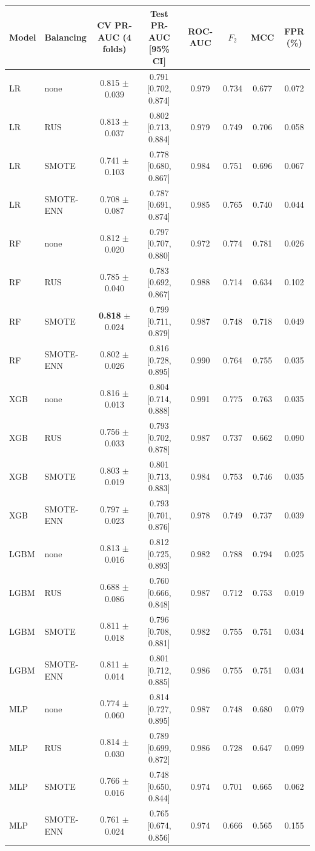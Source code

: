 \begin{tabular}{llcccccc}
\hline
Model & Balancing & CV PR-AUC (4 folds) & Test PR-AUC [95\% CI] & ROC-AUC & $F_2$ & MCC & FPR (\%) \\
\hline
LR & none & {0.815} $\pm$ 0.039 & 0.791 [0.702, 0.874] & 0.979 & 0.734 & 0.677 & 0.072 \\
LR & RUS & {0.813} $\pm$ 0.037 & 0.802 [0.713, 0.884] & 0.979 & 0.749 & 0.706 & 0.058 \\
LR & SMOTE & {0.741} $\pm$ 0.103 & 0.778 [0.680, 0.867] & 0.984 & 0.751 & 0.696 & 0.067 \\
LR & SMOTE-ENN & {0.708} $\pm$ 0.087 & 0.787 [0.691, 0.874] & 0.985 & 0.765 & 0.740 & 0.044 \\
RF & none & {0.812} $\pm$ 0.020 & 0.797 [0.707, 0.880] & 0.972 & 0.774 & 0.781 & 0.026 \\
RF & RUS & {0.785} $\pm$ 0.040 & 0.783 [0.692, 0.867] & 0.988 & 0.714 & 0.634 & 0.102 \\
RF & SMOTE & \textbf{0.818} $\pm$ 0.024 & 0.799 [0.711, 0.879] & 0.987 & 0.748 & 0.718 & 0.049 \\
RF & SMOTE-ENN & {0.802} $\pm$ 0.026 & 0.816 [0.728, 0.895] & 0.990 & 0.764 & 0.755 & 0.035 \\
XGB & none & {0.816} $\pm$ 0.013 & 0.804 [0.714, 0.888] & 0.991 & 0.775 & 0.763 & 0.035 \\
XGB & RUS & {0.756} $\pm$ 0.033 & 0.793 [0.702, 0.878] & 0.987 & 0.737 & 0.662 & 0.090 \\
XGB & SMOTE & {0.803} $\pm$ 0.019 & 0.801 [0.713, 0.883] & 0.984 & 0.753 & 0.746 & 0.035 \\
XGB & SMOTE-ENN & {0.797} $\pm$ 0.023 & 0.793 [0.701, 0.876] & 0.978 & 0.749 & 0.737 & 0.039 \\
LGBM & none & {0.813} $\pm$ 0.016 & 0.812 [0.725, 0.893] & 0.982 & 0.788 & 0.794 & 0.025 \\
LGBM & RUS & {0.688} $\pm$ 0.086 & 0.760 [0.666, 0.848] & 0.987 & 0.712 & 0.753 & 0.019 \\
LGBM & SMOTE & {0.811} $\pm$ 0.018 & 0.796 [0.708, 0.881] & 0.982 & 0.755 & 0.751 & 0.034 \\
LGBM & SMOTE-ENN & {0.811} $\pm$ 0.014 & 0.801 [0.712, 0.885] & 0.986 & 0.755 & 0.751 & 0.034 \\
MLP & none & {0.774} $\pm$ 0.060 & 0.814 [0.727, 0.895] & 0.987 & 0.748 & 0.680 & 0.079 \\
MLP & RUS & {0.814} $\pm$ 0.030 & 0.789 [0.699, 0.872] & 0.986 & 0.728 & 0.647 & 0.099 \\
MLP & SMOTE & {0.766} $\pm$ 0.016 & 0.748 [0.650, 0.844] & 0.974 & 0.701 & 0.665 & 0.062 \\
MLP & SMOTE-ENN & {0.761} $\pm$ 0.024 & 0.765 [0.674, 0.856] & 0.974 & 0.666 & 0.565 & 0.155 \\
\hline
\end{tabular}
